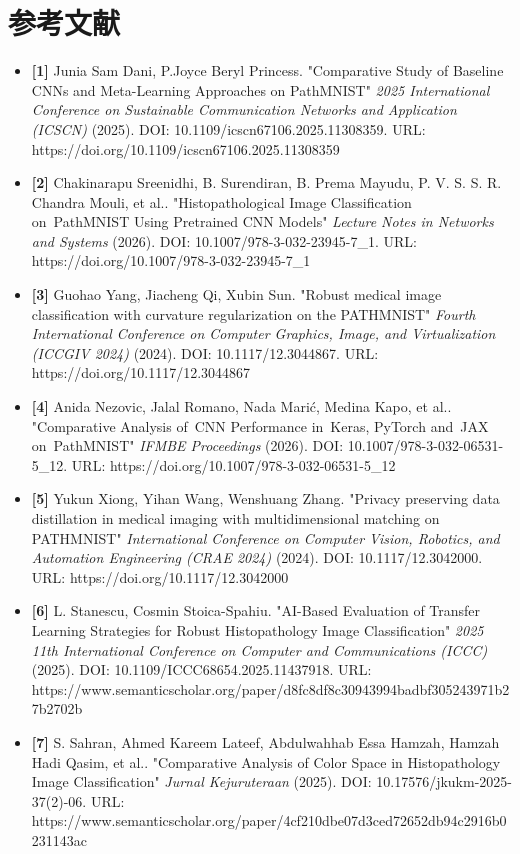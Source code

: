 \documentclass[10pt]{article}
\begin{document}
\section{参考文献}
\begin{itemize}
\item \textbf{[1]} Junia Sam Dani, P.Joyce Beryl Princess. "Comparative Study of Baseline CNNs and Meta-Learning Approaches on PathMNIST" \emph{2025 International Conference on Sustainable Communication Networks and Application (ICSCN)} (2025). DOI: 10.1109/icscn67106.2025.11308359. URL: https://doi.org/10.1109/icscn67106.2025.11308359
\item \textbf{[2]} Chakinarapu Sreenidhi, B. Surendiran, B. Prema Mayudu, P. V. S. S. R. Chandra Mouli, et al.. "Histopathological Image Classification on PathMNIST Using Pretrained CNN Models" \emph{Lecture Notes in Networks and Systems} (2026). DOI: 10.1007/978-3-032-23945-7\_1. URL: https://doi.org/10.1007/978-3-032-23945-7\_1
\item \textbf{[3]} Guohao Yang, Jiacheng Qi, Xubin Sun. "Robust medical image classification with curvature regularization on the PATHMNIST" \emph{Fourth International Conference on Computer Graphics, Image, and Virtualization (ICCGIV 2024)} (2024). DOI: 10.1117/12.3044867. URL: https://doi.org/10.1117/12.3044867
\item \textbf{[4]} Anida Nezovic, Jalal Romano, Nada Marić, Medina Kapo, et al.. "Comparative Analysis of CNN Performance in Keras, PyTorch and JAX on PathMNIST" \emph{IFMBE Proceedings} (2026). DOI: 10.1007/978-3-032-06531-5\_12. URL: https://doi.org/10.1007/978-3-032-06531-5\_12
\item \textbf{[5]} Yukun Xiong, Yihan Wang, Wenshuang Zhang. "Privacy preserving data distillation in medical imaging with multidimensional matching on PATHMNIST" \emph{International Conference on Computer Vision, Robotics, and Automation Engineering (CRAE 2024)} (2024). DOI: 10.1117/12.3042000. URL: https://doi.org/10.1117/12.3042000
\item \textbf{[6]} L. Stanescu, Cosmin Stoica-Spahiu. "AI-Based Evaluation of Transfer Learning Strategies for Robust Histopathology Image Classification" \emph{2025 11th International Conference on Computer and Communications (ICCC)} (2025). DOI: 10.1109/ICCC68654.2025.11437918. URL: https://www.semanticscholar.org/paper/d8fc8df8\allowbreak{}c3094399\allowbreak{}4badbf30\allowbreak{}5243971b\allowbreak{}27b2702b
\item \textbf{[7]} S. Sahran, Ahmed Kareem Lateef, Abdulwahhab Essa Hamzah, Hamzah Hadi Qasim, et al.. "Comparative Analysis of Color Space in Histopathology Image Classification" \emph{Jurnal Kejuruteraan} (2025). DOI: 10.17576/jkukm-2025-37(2)-06. URL: https://www.semanticscholar.org/paper/4cf210db\allowbreak{}e07d3ced\allowbreak{}72652db9\allowbreak{}4c2916b0\allowbreak{}231143ac

\end{itemize}
\end{document}
